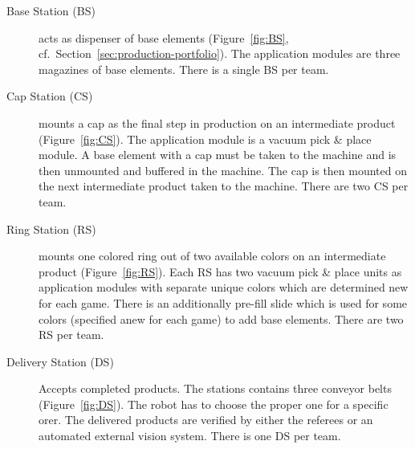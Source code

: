 \documentclass[12pt,twoside]{article}
\newcommand{\refsec}[1]{Section~\ref{#1}}
\newcommand{\reffig}[1]{Figure~\ref{#1}}
\begin{document}
\begin{description}
\item[Base Station (BS)] acts as dispenser of base elements
  (\reffig{fig:BS}, cf.~\refsec{sec:production-portfolio}). The
  application modules are three magazines of base elements. There is a
  single BS per team.

\item[Cap Station (CS)] mounts a cap as the final step in production
  on an intermediate product (\reffig{fig:CS}). The application module
  is a vacuum pick \& place module. A base element with a cap must be
  taken to the machine and is then unmounted and buffered in the
  machine. The cap is then mounted on the next intermediate product
  taken to the machine. There are two CS per team.

\item[Ring Station (RS)] mounts one colored ring out of two available
  colors on an intermediate product (\reffig{fig:RS}). Each RS has two
  vacuum pick \& place units as application modules with separate
  unique colors which are determined new for each game. There is an
  additionally pre-fill slide which is used for some colors (specified
  anew for each game) to add base elements. There are two RS per team.

\item[Delivery Station (DS)] Accepts completed products. The stations
  contains three conveyor belts (\reffig{fig:DS}). The robot has to
  choose the proper one for a specific orer. The delivered products
  are verified by either the referees or an automated external vision
  system. There is one DS per team.
\end{description}
\end{document}
